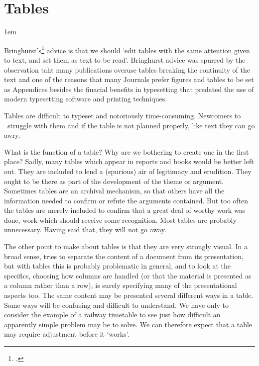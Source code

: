 \chapter{Tables}
\parindent1em
\label{ch:tables}

Bringhurst's\footcite{Bringhurst2005} advice is that we should  `edit tables with the same 
attention given to text, and set them as text to be read'. Bringhurst advice was spurred by the observation taht many publications overuse tables 
breaking the continuity of the text and one of the reasons that many Journals prefer figures and 
tables to be set as Appendices besides the finacial benefits in typesetting that predated the
use of modern typesetting software and printing techniques.

Tables are difficult to typeset and notoriously time-consuming. Newcomers to \latex\
struggle with them and if the table is not planned properly, like text they can go awry. 

  What is the function of a table?
Why are we bothering to create one in the first place?
Sadly, many tables which appear in reports and books would
be better left out. They are included to lend a (spurious) air
of legitimacy and erudition. They ought to be there as part
of the development of the theme or argument. Sometimes
tables are an archival mechanism, so that others have all the
information needed to confirm or refute the arguments contained.
But too often the tables are merely included to confirm
that a great deal of worthy work was done, work which
should receive some recognition. Most tables are probably
unnecessary. Having said that, they will not go away.

The other point to make about tables is that they are very
strongly visual. In a broad sense, \latex tries to separate the
content of a document from its presentation, but with tables
this is probably problematic in general, and to look at the
specifics, choosing how columns are handled (or that the material
is presented as a column rather than a row), is surely
specifying many of the presentational aspects too. The same
content may be presented several different ways in a table.
Some ways will be confusing and difficult to understand. We
have only to consider the example of a railway timetable to
see just how difficult an apparently simple problem may be
to solve. We can therefore expect that a table may require
adjustment before it `works'.

